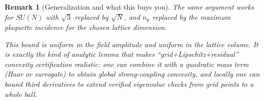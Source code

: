 \documentclass[11pt]{article}
\newtheorem{remark}{Remark}
\begin{document}
\begin{remark}[Generalization and what this buys you]
The same argument works for $SU(N)$ with $\sqrt{3}$ replaced by $\sqrt{N}$, and $n_p$ replaced by the maximum plaquette incidence for the chosen lattice dimension.

This bound is \emph{uniform in the field amplitude} and \emph{uniform in the lattice volume}.
It is exactly the kind of analytic lemma that makes ``grid+Lipschitz+residual'' convexity certification realistic: one can combine it with a quadratic mass term (Haar or surrogate) to obtain global strong-coupling convexity, and locally one can bound third derivatives to extend verified eigenvalue checks from grid points to a whole ball.
\end{remark}
\end{document}
